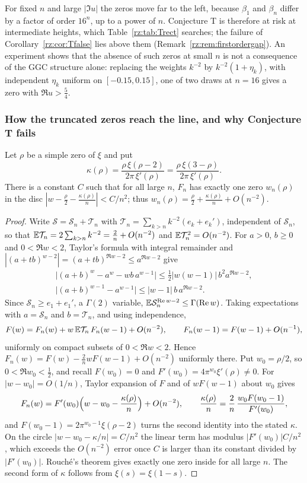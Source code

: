 For fixed $n$ and large $|\Im u|$ the zeros move far to the left, because $\beta_1$ and $\beta_n$ differ by a factor of order $16^n$, up to a power of $n$. Conjecture T is therefore at risk at intermediate heights, which Table~\ref{rz:tab:Trect} searches; the failure of Corollary~\ref{rz:cor:Tfalse} lies above them (Remark~\ref{rz:rem:firstordergap}). An experiment shows that the absence of such zeros at small $n$ is not a consequence of the GGC structure alone: replacing the weights $k^{-2}$ by $k^{-2}(1+\eta_k)$, with independent $\eta_k$ uniform on $[-0.15,0.15]$, one of two draws at $n=16$ gives a zero with $\Re u>\frac54$.

\subsubsection{How the truncated zeros reach the line, and why Conjecture T fails}

\begin{proposition}\label{rz:prop:firstorder}
Let $\rho$ be a simple zero of $\xi$ and put
\[
\kappa(\rho)=\frac{\rho\,\xi(\rho-2)}{2\pi\,\xi'(\rho)}=\frac{\rho\,\xi(3-\rho)}{2\pi\,\xi'(\rho)} .
\]
There is a constant $C$ such that for all large $n$, $F_n$ has exactly one zero $w_n(\rho)$ in the disc $|w-\frac\rho2-\frac{\kappa(\rho)}n|<C/n^2$; thus $w_n(\rho)=\frac\rho2+\frac{\kappa(\rho)}n+O(n^{-2})$.
\end{proposition}

\begin{proof}
Write $\mathcal S=\mathcal S_n+\mathcal T_n$ with $\mathcal T_n=\sum_{k>n}k^{-2}(e_k+e_k')$, independent of $\mathcal S_n$, so that $\mathbb{E}\mathcal T_n=2\sum_{k>n}k^{-2}=\frac2n+O(n^{-2})$ and $\mathbb{E}\mathcal T_n^2=O(n^{-2})$. For $a>0$, $b\ge0$ and $0<\Re w<2$, Taylor's formula with integral remainder and $|(a+tb)^{w-2}|=(a+tb)^{\Re w-2}\le a^{\Re w-2}$ give
\begin{gather*}
\bigl|(a+b)^w-a^w-wb\,a^{w-1}\bigr|\le\tfrac12|w(w-1)|\,b^2a^{\Re w-2},\\
\bigl|(a+b)^{w-1}-a^{w-1}\bigr|\le|w-1|\,b\,a^{\Re w-2}.
\end{gather*}
Since $\mathcal S_n\ge e_1+e_1'$, a $\Gamma(2)$ variable, $\mathbb{E}\mathcal S_n^{\operatorname{Re} w-2}\le\Gamma(\operatorname{Re} w)$. Taking expectations with $a=\mathcal S_n$ and $b=\mathcal T_n$, and using independence,
\[
F(w)=F_n(w)+w\,\mathbb{E}\mathcal T_n\,F_n(w-1)+O(n^{-2}),\qquad F_n(w-1)=F(w-1)+O(n^{-1}),
\]
uniformly on compact subsets of $0<\Re w<2$. Hence $F_n(w)=F(w)-\frac2nwF(w-1)+O(n^{-2})$ uniformly there. Put $w_0=\rho/2$, so $0<\Re w_0<\frac12$, and recall $F(w_0)=0$ and $F'(w_0)=4\pi^{w_0}\xi'(\rho)\ne0$. For $|w-w_0|=O(1/n)$, Taylor expansion of $F$ and of $wF(w-1)$ about $w_0$ gives
\[
F_n(w)=F'(w_0)\Bigl(w-w_0-\frac{\kappa(\rho)}n\Bigr)+O(n^{-2}),\qquad\frac{\kappa(\rho)}n=\frac2n\,\frac{w_0F(w_0-1)}{F'(w_0)},
\]
and $F(w_0-1)=2\pi^{w_0-1}\xi(\rho-2)$ turns the second identity into the stated $\kappa$. On the circle $|w-w_0-\kappa/n|=C/n^2$ the linear term has modulus $|F'(w_0)|C/n^2$, which exceeds the $O(n^{-2})$ error once $C$ is larger than its constant divided by $|F'(w_0)|$. Rouch\'e's theorem gives exactly one zero inside for all large $n$. The second form of $\kappa$ follows from $\xi(s)=\xi(1-s)$.
\end{proof}

